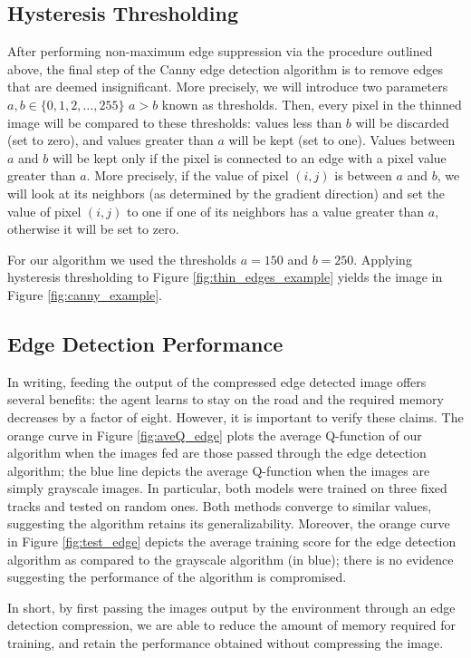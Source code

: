 \subsection{Hysteresis Thresholding}
After performing non-maximum edge suppression via the procedure outlined
above, the final step of the Canny edge detection algorithm is to remove
edges that are deemed insignificant. More precisely, we will introduce
two parameters $a,b \in \{0,1,2,\ldots, 255\}$ $a > b$ known as
thresholds. Then, every pixel in the thinned image will be compared to 
these thresholds: values less than $b$ will be discarded (set to zero), 
and values greater than $a$ will be kept (set to one). Values 
between $a$ and $b$ will be kept only if the pixel is connected to
an edge with a pixel value greater than $a$. More precisely, 
if the value of pixel $(i,j)$ is between $a$ and $b$, we will look
at its neighbors (as determined by the gradient direction) and 
set the value of pixel $(i,j)$ to one if one of its neighbors has
a value greater than $a$, otherwise it will be set to zero.

For our algorithm we used the thresholds $a = 150$ and $b=250$. 
Applying hysteresis thresholding to Figure \ref{fig:thin_edges_example}
yields the image in Figure \ref{fig:canny_example}.

\subsection{Edge Detection Performance}
In writing, feeding the output of the compressed edge detected image
offers several benefits: the agent learns to stay on the road and the
required memory decreases by a factor of eight. However, it is 
important to verify these claims. The orange curve in Figure 
\ref{fig:aveQ_edge} plots the average Q-function of our algorithm when 
the images fed are those passed through the edge detection algorithm; the
blue line depicts the average Q-function when the images are simply 
grayscale images. In particular, both models were trained on three
fixed tracks and tested on random ones. Both methods converge to similar 
values, suggesting the algorithm retains its generalizability. Moreover,
the orange curve in Figure \ref{fig:test_edge} depicts the average
training score for the edge detection algorithm as compared to the
grayscale algorithm (in blue); there is no evidence suggesting the
performance of the algorithm is compromised. 


In short, by first passing the images output by the environment through
an edge detection compression, we are able to reduce the amount of 
memory required for training, and retain the performance obtained 
without compressing the image. 

